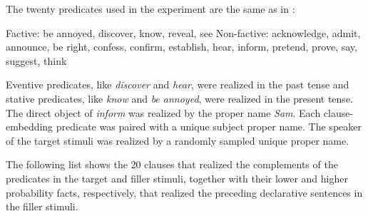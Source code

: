 \documentclass[11pt,fleqn]{article}
\newcommand{\6}{\mbox{$[\hspace*{-.6mm}[$}}
\newcommand{\9}{\mbox{$]\hspace*{-.6mm}]$}}
\begin{document}
The twenty predicates used in the experiment are the same as in \citealt{degen-tonhauser-openmind,degen-tonhauser-language}:

\begin{exe}
\ex\label{predicates}
\begin{xlist}
\ex Factive: be annoyed, discover, know, reveal, see
\ex Non-factive: acknowledge, admit, announce, be right, confess, confirm, establish, hear, inform, pretend, prove, say, suggest, think
\end{xlist}
\end{exe}

Eventive predicates, like {\em discover} and {\em hear}, were realized in the past tense and stative predicates, like {\em know} and {\em be annoyed}, were realized in the present tense. The direct object of {\em inform} was realized by the proper name {\em Sam}. Each clause-embedding predicate was paired with a unique subject proper name. The speaker of the target stimuli was realized by a randomly sampled unique proper name. 

The following list shows the 20 clauses that realized the complements of the predicates in the target and filler stimuli, together with their lower and higher probability facts, respectively, that realized the preceding declarative sentences in the filler stimuli.
\end{document}
